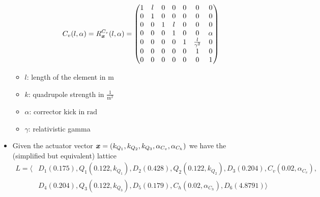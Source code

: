 \begin{itemize}
\begin{itemize}
\begin{equation*}
                C_v(l,\alpha) = R_{\actuators}^{C_v}(l,\alpha) = \begin{pmatrix}
                                                                     1 & l & 0 & 0 & 0 & 0 & 0 \\ %
                                                                     0 & 1 & 0 & 0 & 0 & 0 & 0 \\ %
                                                                     0 & 0 & 1 & l & 0 & 0 & 0 \\ %
                                                                     0 & 0 & 0 & 1 & 0 & 0 & \alpha \\ %
                                                                     0 & 0 & 0 & 0 & 1 & \frac{l}{\gamma^2} & 0 \\ %
                                                                     0 & 0 & 0 & 0 & 0 & 1 & 0 \\ %
                                                                     0 & 0 & 0 & 0 & 0 & 0 & 1 \\
                                                                 \end{pmatrix}
            \end{equation*}
    \end{itemize}
    \begin{itemize}
        \item $l$: length of the element in $\text{m}$
        \item $k$: quadrupole strength in $\frac{1}{\text{m}^2}$
        \item $\alpha$: corrector kick in $\text{rad}$
        \item $\gamma$: relativistic gamma  
    \end{itemize}
    
    \item Given the actuator vector $\bm{x} = (k_{Q_1}, k_{Q_2}, k_{Q_3}, \alpha_{C_v}, \alpha_{C_h})$ we have the (simplified but equivalent) lattice
    \begin{equation*}
    \begin{aligned}
        L = \langle & D_1(0.175), Q_1(0.122,k_{Q_1}), D_2(0.428), Q_2(0.122,k_{Q_2}), D_3(0.204), C_v(0.02,\alpha_{C_v}), \\ & D_4(0.204), Q_3(0.122,k_{Q_3}), D_5(0.179), C_h(0.02,\alpha_{C_h}), D_6(4.8791) \rangle
    \end{aligned}
    \end{equation*}
    

\end{itemize}

